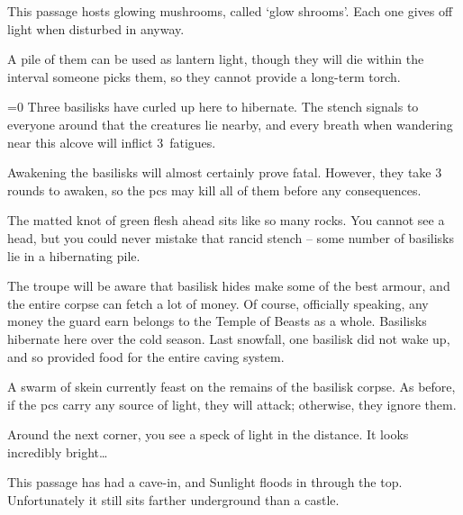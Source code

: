 \begin{multicols}{2}
This passage hosts glowing mushrooms, called `glow shrooms'.%
Each one gives off light when disturbed in anyway.

A pile of them can be used as lantern light, though they will die within the \gls{interval} someone picks them, so they cannot provide a long-term torch.


\ifnum\value{temperature}=0
  Three basilisks have curled up here to hibernate.
  The stench signals to everyone around that the creatures lie nearby, and every breath when wandering near this alcove will inflict 3~\glspl{fatigue}.

  Awakening the basilisks will almost certainly prove fatal.
  However, they take 3 rounds to awaken, so the \glspl{pc} may kill all of them before any consequences.

  \begin{boxtext}
    The matted knot of green flesh ahead sits like so many rocks.
    You cannot see a head, but you could never mistake that rancid stench -- some number of basilisks lie in a hibernating pile.
  \end{boxtext}


  The troupe will be aware that basilisk hides make some of the best armour, and the entire corpse can fetch a lot of money.
  Of course, officially speaking, any money the \gls{guard} earn belongs to the Temple of Beasts as a whole.%
\else
  Basilisks hibernate here over the cold season.
  Last snowfall, one basilisk did not wake up, and so provided food for the entire caving system.

  A swarm of skein currently feast on the remains of the basilisk corpse.
  As before, if the \glspl{pc} carry any source of light, they will attack; otherwise, they ignore them.

  \skeinSwarm

\fi

\begin{boxtext}
  Around the next corner, you see a speck of light in the distance.
  It looks incredibly bright\ldots
\end{boxtext}


This passage has had a cave-in, and Sunlight floods in through the top.
Unfortunately it still sits farther underground than a castle.


\end{multicols}
